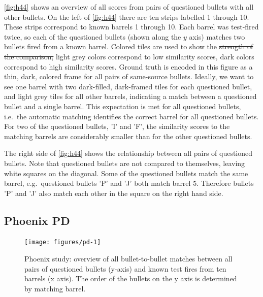 \documentclass[doubleblind]{elsarticle}\usepackage[]{graphicx}\usepackage[]{color}
\newenvironment{knitrout}{}{} %
\providecommand{\DIFaddtex}[1]{{\protect\color{blue}\uwave{#1}}} %
\providecommand{\DIFdeltex}[1]{{\protect\color{red}\sout{#1}}}                      %
\providecommand{\DIFaddbegin}{} %
\providecommand{\DIFaddend}{} %
\providecommand{\DIFdelbegin}{} %
\providecommand{\DIFdelend}{} %
\providecommand{\DIFadd}[1]{\texorpdfstring{\DIFaddtex{#1}}{#1}} %
\providecommand{\DIFdel}[1]{\texorpdfstring{\DIFdeltex{#1}}{}} %
\newcommand{\DIFscaledelfig}{0.5}
\newlength{\DIFdelgraphicswidth} %
\newlength{\DIFdelgraphicsheight} %
\newcommand{\DIFaddincludegraphics}[2][]{{\color{blue}\fbox{\DIFOincludegraphics[#1]{#2}}}} %
\newcommand{\DIFdelincludegraphics}[2][]{%
\sbox{\DIFdelgraphicsbox}{\DIFOincludegraphics[#1]{#2}}%
\settoboxwidth{\DIFdelgraphicswidth}{\DIFdelgraphicsbox} %
\settoboxtotalheight{\DIFdelgraphicsheight}{\DIFdelgraphicsbox} %
\scalebox{\DIFscaledelfig}{%
\parbox[b]{\DIFdelgraphicswidth}{\usebox{\DIFdelgraphicsbox}\\[-\baselineskip] \rule{\DIFdelgraphicswidth}{0em}}\llap{\resizebox{\DIFdelgraphicswidth}{\DIFdelgraphicsheight}{%
\setlength{\unitlength}{\DIFdelgraphicswidth}%
\begin{picture}(1,1)%
\thicklines\linethickness{2pt} %
{\color[rgb]{1,0,0}\put(0,0){\framebox(1,1){}}}%
{\color[rgb]{1,0,0}\put(0,0){\line( 1,1){1}}}%
{\color[rgb]{1,0,0}\put(0,1){\line(1,-1){1}}}%
\end{picture}%
}\hspace*{3pt}}} %
} %
\DeclareRobustCommand{\DIFaddbegin}{\DIFOaddbegin \let\includegraphics\DIFaddincludegraphics} %
\DeclareRobustCommand{\DIFaddend}{\DIFOaddend \let\includegraphics\DIFOincludegraphics} %
\DeclareRobustCommand{\DIFdelbegin}{\DIFOdelbegin \let\includegraphics\DIFdelincludegraphics} %
\DeclareRobustCommand{\DIFdelend}{\DIFOaddend \let\includegraphics\DIFOincludegraphics} %
\begin{document}
\autoref{fig:h44} shows an overview of all scores from pairs of questioned bullets with all other bullets. On the left of \autoref{fig:h44} there are ten strips labelled 1 through 10. These strips correspond to known barrels 1 through 10. Each barrel was test-fired twice, so each of the questioned bullets (shown along the $y$ axis) matches two bullets fired from a known barrel. Colored tiles are used to show the \DIFdelbegin \DIFdel{strength of the comparison; }\DIFdelend \DIFaddbegin \DIFadd{similarity score: }\DIFaddend light grey colors correspond to low similarity scores, dark colors correspond to high similarity scores. Ground truth is encoded in this figure as a thin, dark, colored frame for all pairs of same-source bullets. 
Ideally, we want to see one barrel with two dark-filled, dark-framed tiles for each questioned bullet, and light grey tiles for all other barrels, indicating a match between a questioned bullet and a single barrel. This expectation is met for all questioned bullets, i.e.\ the automatic matching  identifies the correct barrel for all questioned bullets. For two of the questioned bullets, 'I' and 'F', the similarity scores to the matching barrels are considerably smaller than for the other questioned bullets. 

The right side of \autoref{fig:h44} shows the relationship between all pairs of questioned bullets. Note that questioned bullets are not compared to themselves, leaving white squares on the diagonal. Some of the questioned bullets match the same barrel, e.g.\ questioned bullets 'P' and 'J' both match barrel 5. Therefore bullets 'P' and 'J' also match each other in the square on the right hand side.



\subsection{Phoenix PD}

\begin{knitrout}
\color{fgcolor}\begin{figure}

{\centering \texttt{[image: figures/pd-1]} 

}

\caption[Phoenix study]{Phoenix study: overview of all bullet-to-bullet matches between all pairs of questioned bullets (y-axis) and known test fires from ten barrels (x axis). The order of the bullets on the y axis is determined by matching barrel.}\label{fig:pd}
\end{figure}


\end{knitrout}
\end{document}
